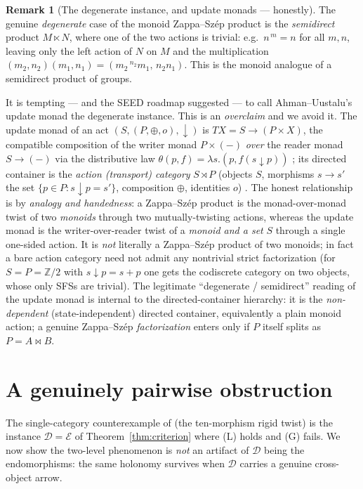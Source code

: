 \documentclass[11pt]{article}
\theoremstyle{definition}
\newtheorem{remark}[theorem]{Remark}
\newcommand{\D}{\mathcal{D}}
\newcommand{\E}{\mathcal{E}}
\newcommand{\lact}[2]{{}^{#1}\!#2}      %
\newcommand{\rest}[2]{#1^{\,#2}}        %
\begin{document}
\begin{remark}[The degenerate instance, and update monads --- honestly]
\label{rem:au}
The genuine \emph{degenerate} case of the monoid Zappa--Sz\'ep product is the
\emph{semidirect} product $M\ltimes N$, where one of the two actions is trivial:
e.g.\ $\rest{n}{m}=n$ for all $m,n$, leaving only the left action of $N$ on $M$
and the multiplication $(m_2,n_2)(m_1,n_1)=(m_2\,\lact{n_2}{m_1},\,n_2 n_1)$. This
is the monoid analogue of a semidirect product of groups.

It is tempting --- and the SEED roadmap suggested --- to call Ahman--Uustalu's
update monad \cite{au-update} the degenerate instance. This is an
\emph{overclaim} and we avoid it. The update monad of an act
$(S,(P,\oplus,o),\downarrow)$ is $TX=S\to(P\times X)$, the compatible composition
of the writer monad $P\times(-)$ \emph{over} the reader monad $S\to(-)$ via the
distributive law $\theta(p,f)=\lambda s.(p,f(s\downarrow p))$
\cite[\S2.2--2.3]{au-update}; its directed container is the
\emph{action (transport) category} $S\rtimes P$ (objects $S$, morphisms
$s\to s'$ the set $\{p\in P:s\downarrow p=s'\}$, composition $\oplus$, identities
$o$) \cite{au-cats}. The honest relationship is by \emph{analogy and handedness}:
a Zappa--Sz\'ep product is the monad-over-monad twist of two \emph{monoids}
through two mutually-twisting actions, whereas the update monad is the
writer-over-reader twist of a \emph{monoid and a set} $S$ through a single
one-sided action. It is \emph{not} literally a Zappa--Sz\'ep product of two
monoids; in fact a bare action category need not admit any nontrivial strict
factorization (for $S=P=\mathbb{Z}/2$ with $s\downarrow p=s+p$ one gets the
codiscrete category on two objects, whose only SFSs are trivial). The legitimate
``degenerate / semidirect'' reading of the update monad is internal to the
directed-container hierarchy: it is the \emph{non-dependent} (state-independent)
directed container, equivalently a plain monoid action; a genuine Zappa--Sz\'ep
\emph{factorization} enters only if $P$ itself splits as $P=A\bowtie B$.
\end{remark}

\section{A genuinely pairwise obstruction}\label{sec:ce}

The single-category counterexample of \cite{single} (the ten-morphism rigid
twist) is the instance $\D=\E$ of Theorem~\ref{thm:criterion} where (L) holds and
(G) fails. We now show the two-level phenomenon is \emph{not} an artifact of
$\D$ being the endomorphisms: the same holonomy survives when $\D$ carries a
genuine cross-object arrow.
\end{document}

